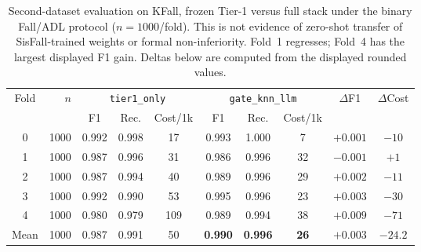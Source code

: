 \begin{table}[!t]
\centering
\caption{Second-dataset evaluation on KFall, frozen Tier-1 versus full stack under the binary Fall/ADL protocol ($n{=}1000$/fold). This is not evidence of zero-shot transfer of SisFall-trained weights or formal non-inferiority. Fold~1 regresses; Fold~4 has the largest displayed F1 gain. Deltas below are computed from the displayed rounded values.}
\label{tab:kfallperfold}
\begin{tabular}{c r ccc ccc cc}
\toprule
Fold & $n$ & \multicolumn{3}{c}{\texttt{tier1\_only}} & \multicolumn{3}{c}{\texttt{gate\_knn\_llm}} & $\Delta$F1 & $\Delta$Cost \\
\cmidrule(lr){3-5}\cmidrule(lr){6-8}
 & & F1 & Rec. & Cost/1k & F1 & Rec. & Cost/1k & & \\
\midrule
0 & 1000 & 0.992 & 0.998 & 17  & 0.993 & 1.000 & 7  & $+0.001$ & $-10$ \\
1 & 1000 & 0.987 & 0.996 & 31  & 0.986 & 0.996 & 32 & $-0.001$ & $+1$  \\
2 & 1000 & 0.987 & 0.994 & 40  & 0.989 & 0.996 & 29 & $+0.002$ & $-11$ \\
3 & 1000 & 0.992 & 0.990 & 53  & 0.995 & 0.996 & 23 & $+0.003$ & $-30$ \\
4 & 1000 & 0.980 & 0.979 & 109 & 0.989 & 0.994 & 38 & $+0.009$ & $-71$ \\
\midrule
Mean & 1000 & 0.987 & 0.991 & 50 & \textbf{0.990} & \textbf{0.996} & \textbf{26} & $+0.003$ & $-24.2$ \\
\bottomrule
\end{tabular}
\end{table}
